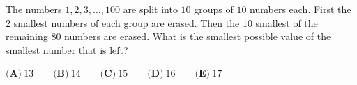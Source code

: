 The numbers $1,2,3,\dots,100$ are split into $10$ groups of $10$ numbers each. First the $2$ smallest numbers of each group are erased. Then the $10$ smallest of the remaining $80$ numbers are erased. What is the smallest possible value of the smallest number that is left?

$\textbf{(A)}\ 13\qquad\textbf{(B)}\ 14\qquad\textbf{(C)}\ 15\qquad\textbf{(D)}\ 16\qquad\textbf{(E)}\ 17$
